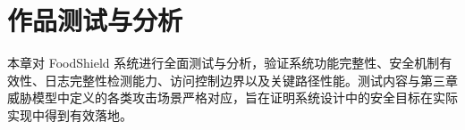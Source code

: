 %
%
\section{作品测试与分析}

本章对 FoodShield 系统进行全面测试与分析，验证系统功能完整性、安全机制有效性、日志完整性检测能力、访问控制边界以及关键路径性能。测试内容与第三章威胁模型中定义的各类攻击场景严格对应，旨在证明系统设计中的安全目标在实际实现中得到有效落地。








